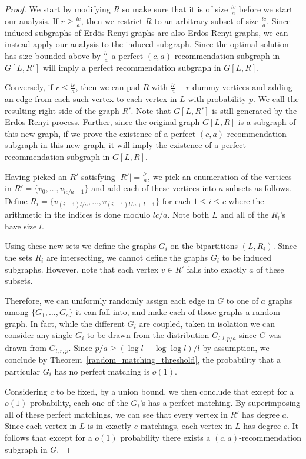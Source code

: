 \begin{proof}
We start by modifying $R$ so make sure that it is of size $\frac{lc}{a}$ before we
start our analysis. If $r\geq\frac{lc}{a}$, then we restrict $R$
to an arbitrary subset of size $\frac{lc}{a}$. Since induced subgraphs of
Erd\"{o}s-Renyi graphs are also Erd\"{o}s-Renyi graphs, we can instead
apply our analysis to the induced subgraph. Since the optimal
solution has size bounded above by $\frac{lc}{a}$ a perfect $(c,a)$-recommendation
subgraph in $G[L,R']$ will imply a perfect recommendation subgraph in $G[L,R]$. \vs

Conversely, if $r \leq\frac{lc}{a}$, then we can pad $R$ with $\frac{lc}{a}-r$ 
dummy vertices and adding an edge from each such vertex to each vertex in $L$
with probability $p$. We call the resulting right side of the graph $R'$.
Note that $G[L,R']$ is still generated by the Erd\"{o}s-Renyi process. Further,
since the original graph $G[L,R]$ is a subgraph of this new graph, if we prove
the existence of a perfect $(c,a)$-recommendation subgraph in this new graph, it
will imply the existence of a perfect recommendation subgraph in $G[L,R]$. \vs

Having picked an $R'$ satisfying $|R'|=\frac{lc}{a}$, we pick an enumeration 
of the vertices in $R'=\{v_0,\ldots, v_{lc/a-1}\}$
and add each of these vertices into $a$ subsets as follows. Define
$R_i = \{v_{(i-1)l/a}, \ldots, v_{(i-1)l/a+l-1}\}$ for each $1\leq i\leq c$ where
the arithmetic in the indices is done modulo $lc/a$. Note both $L$ and all of
the $R_i$'s have size $l$. \vs

Using these new sets we define the graphs $G_i$ on the bipartitions
$(L, R_i)$. Since the sets $R_i$ are intersecting, we cannot define the
graphs $G_i$ to be induced subgraphs. However, note that each vertex $v\in R'$
falls into exactly $a$ of these subsets. \vs

Therefore, we can uniformly randomly assign each edge in $G$ to one of $a$ graphs among $\{G_1,\ldots, G_c\}$ it can fall into,
and make each of those graphs a random graph. In fact, while the different
$G_i$ are coupled, taken in isolation we can consider any single $G_i$ to be
drawn from the distribution $G_{l,l,p/a}$ since $G$ was drawn from $G_{l,r,p}$.
Since $p/a \geq (\log l - \log\log l)/l$ by assumption, we conclude by
Theorem~\ref{random_matching_threshold}, the probability that a particular
$G_i$ has no perfect matching is $o(1)$. \vs

Considering $c$ to be fixed, by a union bound, we then conclude that except
for a $o(1)$ probability, each one of the $G_i$'s has a perfect matching. By
superimposing all of these perfect matchings, we can see that every vertex in
$R'$ has degree $a$. Since each vertex in $L$ is in exactly $c$ matchings, each
vertex in $L$ has degree $c$. It follows that except for a $o(1)$ probability
there exists a $(c,a)$-recommendation subgraph in $G$.
\end{proof}

